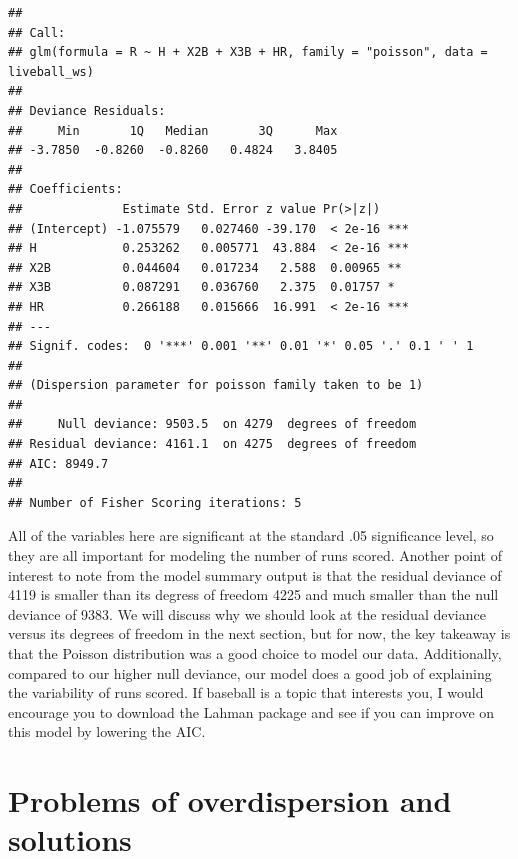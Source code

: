 \documentclass[
]{book}
\begin{document}
\begin{verbatim}
## 
## Call:
## glm(formula = R ~ H + X2B + X3B + HR, family = "poisson", data = liveball_ws)
## 
## Deviance Residuals: 
##     Min       1Q   Median       3Q      Max  
## -3.7850  -0.8260  -0.8260   0.4824   3.8405  
## 
## Coefficients:
##              Estimate Std. Error z value Pr(>|z|)    
## (Intercept) -1.075579   0.027460 -39.170  < 2e-16 ***
## H            0.253262   0.005771  43.884  < 2e-16 ***
## X2B          0.044604   0.017234   2.588  0.00965 ** 
## X3B          0.087291   0.036760   2.375  0.01757 *  
## HR           0.266188   0.015666  16.991  < 2e-16 ***
## ---
## Signif. codes:  0 '***' 0.001 '**' 0.01 '*' 0.05 '.' 0.1 ' ' 1
## 
## (Dispersion parameter for poisson family taken to be 1)
## 
##     Null deviance: 9503.5  on 4279  degrees of freedom
## Residual deviance: 4161.1  on 4275  degrees of freedom
## AIC: 8949.7
## 
## Number of Fisher Scoring iterations: 5
\end{verbatim}

All of the variables here are significant at the standard .05 significance level, so they are all important for modeling the number of runs scored. Another point of interest to note from the model summary output is that the residual deviance of 4119 is smaller than its degress of freedom 4225 and much smaller than the null deviance of 9383. We will discuss why we should look at the residual deviance versus its degrees of freedom in the next section, but for now, the key takeaway is that the Poisson distribution was a good choice to model our data. Additionally, compared to our higher null deviance, our model does a good job of explaining the variability of runs scored. If baseball is a topic that interests you, I would encourage you to download the Lahman package and see if you can improve on this model by lowering the AIC.

\hypertarget{problems-of-overdispersion-and-solutions}{%
\section{Problems of overdispersion and solutions}\label{problems-of-overdispersion-and-solutions}}
\end{document}
